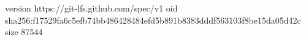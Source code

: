 version https://git-lfs.github.com/spec/v1
oid sha256:f17529fa6c5efb74bb486428484efd5b891b8383dddf563103f8be15da05d42c
size 87544

